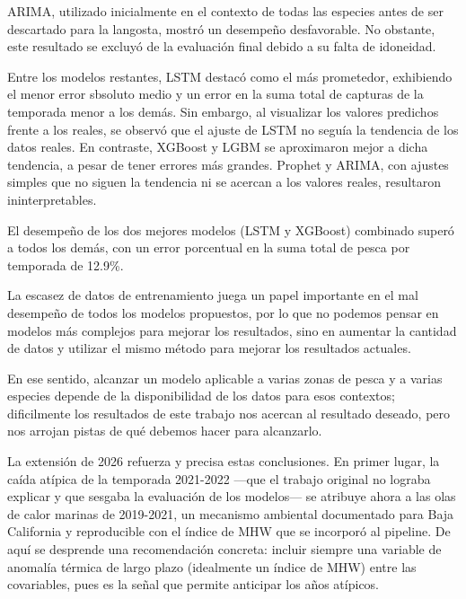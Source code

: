 \documentclass[twoside,11pt]{article}
\begin{document}
ARIMA, utilizado inicialmente en el contexto de todas las especies antes de ser descartado para la langosta, mostró un desempeño desfavorable. No obstante, este resultado se excluyó de la evaluación final debido a su falta de idoneidad.

Entre los modelos restantes, LSTM destacó como el más prometedor, exhibiendo el menor error sbsoluto medio y un error en la suma total de capturas de la temporada menor a los demás. Sin embargo, al visualizar los valores predichos frente a los reales, se observó que el ajuste de LSTM no seguía la tendencia de los datos reales. En contraste, XGBoost y LGBM se aproximaron mejor a dicha tendencia, a pesar de tener errores más grandes. Prophet y ARIMA, con ajustes simples que no siguen la tendencia ni se acercan a los valores reales, resultaron ininterpretables. 

El desempeño de los dos mejores modelos (LSTM y XGBoost) combinado superó a todos los demás, con un error porcentual en la suma total de pesca por temporada de 12.9\%. 

La escasez de datos de entrenamiento juega un papel importante en el mal desempeño de todos los modelos propuestos, por lo que no podemos pensar en modelos más complejos para mejorar los resultados, sino en aumentar la cantidad de datos y utilizar el mismo método para mejorar los resultados actuales.

En ese sentido, alcanzar un modelo aplicable a varias zonas de pesca y a varias especies depende de la disponibilidad de los datos para esos contextos; dificilmente los resultados de este trabajo nos acercan al resultado deseado, pero nos arrojan pistas de qué debemos hacer para alcanzarlo.

La extensión de 2026 refuerza y precisa estas conclusiones. En primer lugar, la caída atípica de la temporada 2021-2022 —que el trabajo original no lograba explicar y que sesgaba la evaluación de los modelos— se atribuye ahora a las olas de calor marinas de 2019-2021, un mecanismo ambiental documentado para Baja California \cite{villasenor2024} y reproducible con el índice de MHW que se incorporó al pipeline. De aquí se desprende una recomendación concreta: incluir siempre una variable de anomalía térmica de largo plazo (idealmente un índice de MHW) entre las covariables, pues es la señal que permite anticipar los años atípicos.
\end{document}
